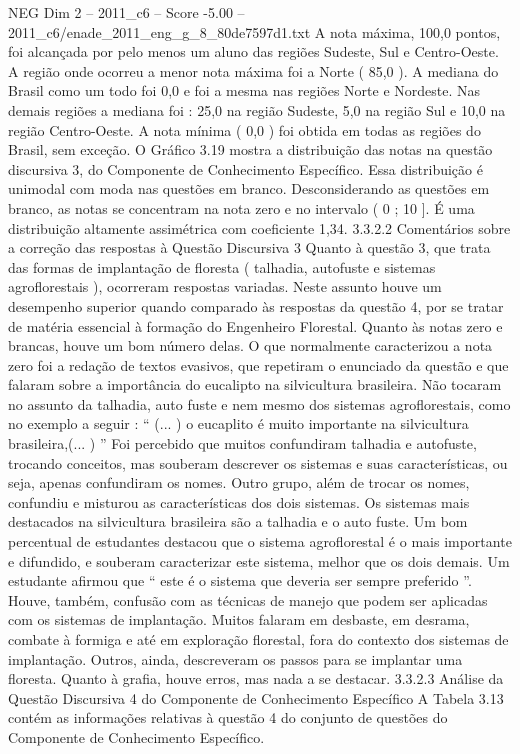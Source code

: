 \begin{textsample}{NEG Dim 2 – 2011\_c6 – Score -5.00 – 2011\_c6/enade\_2011\_eng\_g\_8\_80de7597d1.txt}
A nota máxima, 100,0 pontos, foi alcançada por pelo menos um aluno das regiões Sudeste, Sul e Centro-Oeste.
A região onde ocorreu a menor nota máxima foi a Norte ( 85,0 ).
A mediana do Brasil como um todo foi 0,0 e foi a mesma nas regiões Norte e Nordeste.
Nas demais regiões a mediana foi : 25,0 na região Sudeste, 5,0 na região Sul e 10,0 na região Centro-Oeste.
A nota mínima ( 0,0 ) foi obtida em todas as regiões do Brasil, sem exceção.
O Gráfico 3.19 mostra a distribuição das notas na questão discursiva 3, do Componente de Conhecimento Específico.
Essa distribuição é unimodal com moda nas questões em branco.
Desconsiderando as questões em branco, as notas se concentram na nota zero e no intervalo ( 0 ; 10 ].
É uma distribuição altamente assimétrica com coeficiente 1,34. 3.3.2.2 Comentários sobre a correção das respostas à Questão Discursiva 3 Quanto à questão 3, que trata das formas de implantação de floresta ( talhadia, autofuste e sistemas agroflorestais ), ocorreram respostas variadas.
Neste assunto houve um desempenho superior quando comparado às respostas da questão 4, por se tratar de matéria essencial à formação do Engenheiro Florestal.
Quanto às notas zero e brancas, houve um bom número delas.
O que normalmente caracterizou a nota zero foi a redação de textos evasivos, que repetiram o enunciado da questão e que falaram sobre a importância do eucalipto na silvicultura brasileira.
Não tocaram no assunto da talhadia, auto fuste e nem mesmo dos sistemas agroflorestais, como no exemplo a seguir : “ (... ) o eucaplito é muito importante na silvicultura brasileira,(... ) ” Foi percebido que muitos confundiram talhadia e autofuste, trocando conceitos, mas souberam descrever os sistemas e suas características, ou seja, apenas confundiram os nomes.
Outro grupo, além de trocar os nomes, confundiu e misturou as características dos dois sistemas.
Os sistemas mais destacados na silvicultura brasileira são a talhadia e o auto fuste.
Um bom percentual de estudantes destacou que o sistema agroflorestal é o mais importante e difundido, e souberam caracterizar este sistema, melhor que os dois demais.
Um estudante afirmou que “ este é o sistema que deveria ser sempre preferido ”.
Houve, também, confusão com as técnicas de manejo que podem ser aplicadas com os sistemas de implantação.
Muitos falaram em desbaste, em desrama, combate à formiga e até em exploração florestal, fora do contexto dos sistemas de implantação.
Outros, ainda, descreveram os passos para se implantar uma floresta.
Quanto à grafia, houve erros, mas nada a se destacar. 3.3.2.3 Análise da Questão Discursiva 4 do Componente de Conhecimento Específico A Tabela 3.13 contém as informações relativas à questão 4 do conjunto de questões do Componente de Conhecimento Específico.

\end{textsample}
